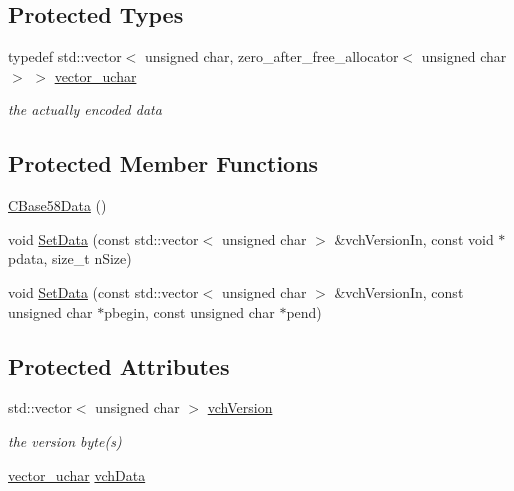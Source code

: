 \subsection*{Protected Types}
\begin{DoxyCompactItemize}
\item 
typedef std\+::vector$<$ unsigned char, zero\+\_\+after\+\_\+free\+\_\+allocator$<$ unsigned char $>$ $>$ \hyperlink{class_c_base58_data_a193d64487a0b4f6df24f8bd380956ec1}{vector\+\_\+uchar}
\begin{DoxyCompactList}\small\item\em the actually encoded data \end{DoxyCompactList}\end{DoxyCompactItemize}
\subsection*{Protected Member Functions}
\begin{DoxyCompactItemize}
\item 
\hyperlink{class_c_base58_data_ae4f4ff42010299bc6fb228e21d6b2a15}{C\+Base58\+Data} ()
\item 
void \hyperlink{class_c_base58_data_afab1c06a0a4f631fd889434a2bc48c27}{Set\+Data} (const std\+::vector$<$ unsigned char $>$ \&vch\+Version\+In, const void $\ast$pdata, size\+\_\+t n\+Size)
\item 
void \hyperlink{class_c_base58_data_a8314b00685e590b4005be5cdfd36aeb9}{Set\+Data} (const std\+::vector$<$ unsigned char $>$ \&vch\+Version\+In, const unsigned char $\ast$pbegin, const unsigned char $\ast$pend)
\end{DoxyCompactItemize}
\subsection*{Protected Attributes}
\begin{DoxyCompactItemize}
\item 
std\+::vector$<$ unsigned char $>$ \hyperlink{class_c_base58_data_a110c1008f399053098a1bdf63408e923}{vch\+Version}
\begin{DoxyCompactList}\small\item\em the version byte(s) \end{DoxyCompactList}\item 
\hyperlink{class_c_base58_data_a193d64487a0b4f6df24f8bd380956ec1}{vector\+\_\+uchar} \hyperlink{class_c_base58_data_ae7ef7dfb93683aa4aaee8b74da5abb9c}{vch\+Data}
\end{DoxyCompactItemize}


